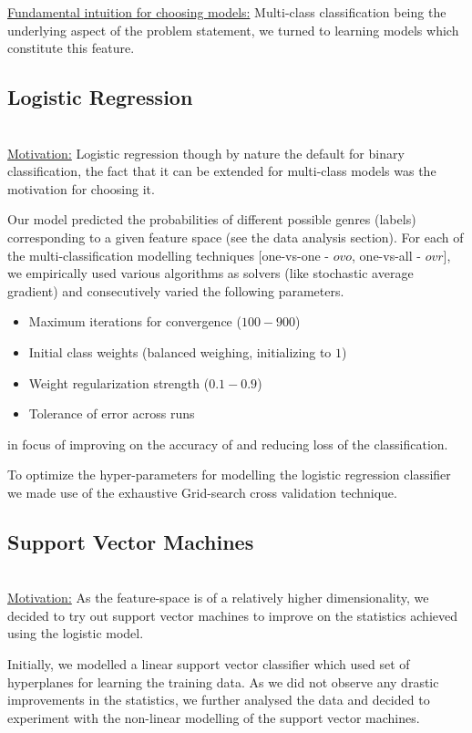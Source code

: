 \documentclass[fleqn,10pt]{SelfArx} %
\begin{document}

\underline{Fundamental intuition for choosing models:} Multi-class classification being the underlying aspect of the problem statement, we turned to learning models which constitute this feature.

\subsection{Logistic Regression}~\\
\underline{Motivation:} Logistic regression though by nature the default for binary classification, the fact that it can be extended for multi-class models was the motivation for choosing it.

Our model predicted the probabilities of different possible genres (labels) corresponding to a given feature space (see the data analysis section). For each of the multi-classification modelling techniques [one-vs-one - $ovo$, one-vs-all - $ovr$], we empirically used various algorithms as solvers (like stochastic average gradient) and consecutively varied the following parameters.
\begin{itemize}
  \item Maximum iterations for convergence ($100-900$)
  \item Initial class weights (balanced weighing, initializing to $1$)
  \item Weight regularization strength ($0.1-0.9$)
  \item Tolerance of error across runs
\end{itemize}
in focus of improving on the accuracy of and reducing loss of the classification.

To optimize the hyper-parameters for modelling the logistic regression classifier we made use of the exhaustive Grid-search cross validation technique.

\subsection{Support Vector Machines}~\\
\underline{Motivation:} As the feature-space is of a relatively higher dimensionality, we decided to try out support vector machines to improve on the statistics achieved using the logistic model.

Initially, we modelled a linear support vector classifier which used set of hyperplanes for learning the training data. As we did not observe any drastic improvements in the statistics, we further analysed the data and decided to experiment with the non-linear modelling of the support vector machines.
\end{document}
